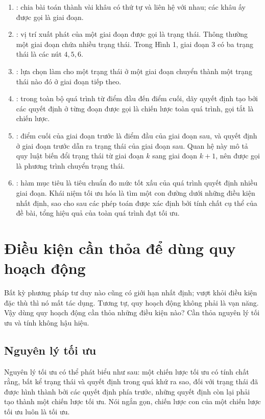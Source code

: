 \documentclass[11pt]{article}
\begin{document}
\begin{enumerate}
  \item {}: chia bài toán thành vài khâu có thứ tự và liên hệ
  với nhau; các khâu ấy được gọi là giai đoạn.
  \item {}: vị trí xuất phát của một giai đoạn được gọi là
  trạng thái. Thông thường một giai đoạn chứa nhiều trạng thái. Trong Hình 1,
  giai đoạn $3$ có ba trạng thái là các nút $4,5,6$.
  \item {}: lựa chọn làm cho một trạng thái ở một giai đoạn
  chuyển thành một trạng thái nào đó ở giai đoạn tiếp theo.
  \item {}: trong toàn bộ quá trình từ điểm đầu đến điểm cuối,
  dãy quyết định tạo bởi các quyết định ở từng đoạn được gọi là chiến lược
  toàn quá trình, gọi tắt là chiến lược.
  \item {}: điểm cuối của giai đoạn trước
  là điểm đầu của giai đoạn sau, và quyết định ở giai đoạn trước dẫn ra trạng
  thái của giai đoạn sau. Quan hệ này mô tả quy luật biến đổi trạng thái từ
  giai đoạn $k$ sang giai đoạn $k+1$, nên được gọi là phương trình chuyển
  trạng thái.
  \item {}: hàm mục tiêu là tiêu
  chuẩn đo mức tốt xấu của quá trình quyết định nhiều giai đoạn. Khái niệm tối
  ưu hóa là tìm một con đường dưới những điều kiện nhất định, sao cho sau các
  phép toán được xác định bởi tính chất cụ thể của đề bài, tổng hiệu quả của
  toàn quá trình đạt tối ưu.
\end{enumerate}

\section{Điều kiện cần thỏa để dùng quy hoạch động}

Bất kỳ phương pháp tư duy nào cũng có giới hạn nhất định; vượt khỏi điều kiện
đặc thù thì nó mất tác dụng. Tương tự, quy hoạch động không phải là vạn năng.
Vậy dùng quy hoạch động cần thỏa những điều kiện nào? Cần thỏa nguyên lý tối
ưu và tính không hậu hiệu.

\subsection{Nguyên lý tối ưu}

Nguyên lý tối ưu có thể phát biểu như sau: một chiến lược tối ưu có tính chất
rằng, bất kể trạng thái và quyết định trong quá khứ ra sao, đối với trạng thái
đã được hình thành bởi các quyết định phía trước, những quyết định còn lại
phải tạo thành một chiến lược tối ưu. Nói ngắn gọn, chiến lược con của một
chiến lược tối ưu luôn là tối ưu.
\end{document}

